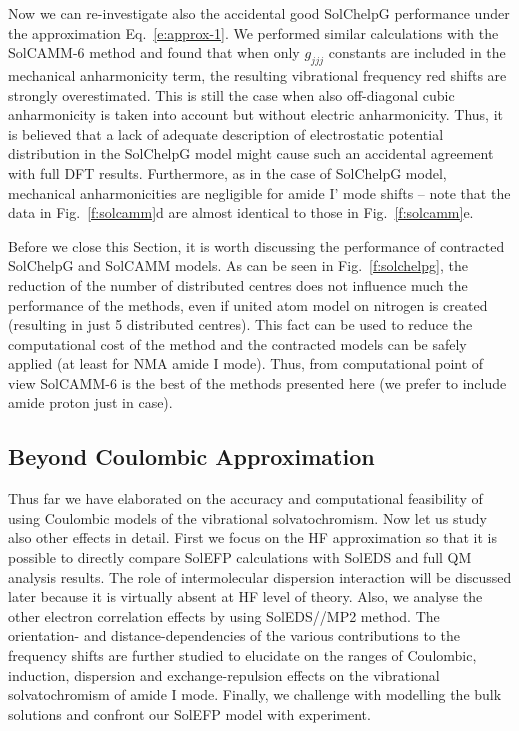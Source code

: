 \documentclass[a4paper,titlepage,twoside,fleqn,12pt]{book}
\begin{document}
\begin{refsection}
Now we can re-investigate also the accidental good SolChelpG performance under the
approximation Eq.~\eqref{e:approx-1}. We performed similar 
calculations with the SolCAMM-6 method and found that when only $g_{jjj}$
constants are included in the mechanical anharmonicity term, 
the resulting vibrational frequency red shifts are strongly overestimated.
This is still the case when also off\hyp{}diagonal cubic anharmonicity
is taken into account but without electric anharmonicity.
Thus, it is believed that a lack of adequate description
of electrostatic potential distribution in the SolChelpG
model might cause such an accidental agreement with full DFT results. Furthermore,
as in the case of SolChelpG model, mechanical
anharmonicities are negligible for amide I' mode shifts -- note
that the data in Fig.~\ref{f:solcamm}d are almost identical to those in
Fig.~\ref{f:solcamm}e.

Before we close this Section, it is worth discussing 
the performance of contracted SolChelpG and
SolCAMM models. As can be seen in Fig.~\ref{f:solchelpg}, 
the reduction of the number of distributed centres
does not influence much the performance of the methods, even if united atom 
model on nitrogen is created (resulting in just 5 distributed centres). 
This fact can be used to reduce the computational cost of the method
and the contracted models can be safely applied (at least for NMA amide I mode).
Thus, from computational point of view SolCAMM-6 is the best of the methods
presented here (we prefer to include amide proton just in case).

\subsection{Beyond Coulombic Approximation}

Thus far we have elaborated on the accuracy and computational
feasibility of using Coulombic models of the vibrational solvatochromism.
Now let us study also other effects in detail.
First we focus on the HF approximation
so that it is possible to directly compare SolEFP calculations
with SolEDS and full QM analysis results. The role of intermolecular dispersion interaction
will be discussed later because it is virtually absent
at HF level of theory. Also, we analyse the other electron correlation
effects by using SolEDS//MP2 method. The orientation\hyp{}
and distance\hyp{}dependencies of the various contributions
to the frequency shifts are further studied to elucidate on
the ranges of Coulombic, induction, dispersion and exchange\hyp{}repulsion
effects on the vibrational solvatochromism of amide I mode.
Finally, we challenge with modelling the bulk solutions
and confront our SolEFP model with experiment.


\end{refsection}
\end{document}
